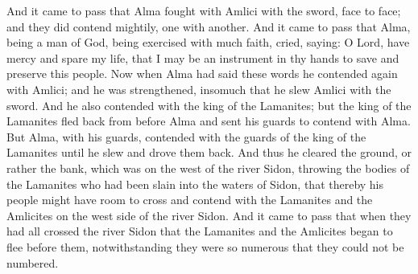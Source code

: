 \bverse \iffalse And it came to pass that Alma fought with Amlici with the sword, face to face; and they did contend mightily, one with another. \fi
And it came to pass that Alma fought with Amlici with the sword, face to face; and they did contend mightily, one with another.
\bverse \iffalse And it came to pass that Alma, being a man of God, being exercised with much faith, cried, saying: O Lord, have mercy and spare my life, that I may be an instrument in thy hands to save and preserve this people. \fi
And it came to pass that Alma, being a man of God, being exercised with much faith, cried, saying: O Lord, have mercy and spare my life, that I may be an instrument in thy hands to save and preserve this people.
\bverse \iffalse Now when Alma had said these words he contended again with Amlici; and he was strengthened, insomuch that he slew Amlici with the sword. \fi
Now when Alma had said these words he contended again with Amlici; and he was strengthened, insomuch that he slew Amlici with the sword.
\bverse \iffalse And he also contended with the king of the Lamanites; but the king of the Lamanites fled back from before Alma and sent his guards to contend with Alma. \fi
And he also contended with the king of the Lamanites; but the king of the Lamanites fled back from before Alma and sent his guards to contend with Alma.
\bverse \iffalse But Alma, with his guards, contended with the guards of the king of the Lamanites until he slew and drove them back. \fi
But Alma, with his guards, contended with the guards of the king of the Lamanites until he slew and drove them back.
\bverse \iffalse And thus he cleared the ground, or rather the bank, which was on the west of the river Sidon, throwing the bodies of the Lamanites who had been slain into the waters of Sidon, that thereby his people might have room to cross and contend with the Lamanites and the Amlicites on the west side of the river Sidon. \fi
And thus he cleared the ground, or rather the bank, which was on the west of the river Sidon, throwing the bodies of the Lamanites who had been slain into the waters of Sidon, that thereby his people might have room to cross and contend with the Lamanites and the Amlicites on the west side of the river Sidon.
\bverse \iffalse And it came to pass that when they had all crossed the river Sidon that the Lamanites and the Amlicites began to flee before them, notwithstanding they were so numerous that they could not be numbered. \fi
And it came to pass that when they had all crossed the river Sidon that the Lamanites and the Amlicites began to flee before them, notwithstanding they were so numerous that they could not be numbered.
